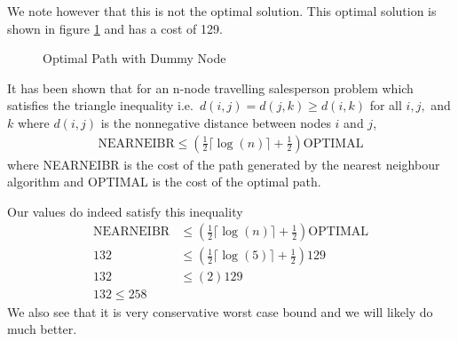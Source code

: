 We note however that this is not the optimal solution. This optimal solution is shown in 
figure \ref{fig:optDummy} and has a cost of 129.

\begin{figure}
\centering
{}
\caption{Optimal Path with Dummy Node}
\label{fig:optDummy}
\end{figure}



It has been shown \cite{rosenkrantz74} that for an n-node travelling salesperson problem which satisfies the triangle inequality i.e.\ $d(i,j) = d(j,k) \geq d(i,k)$ for all $i,j,$ and $k$ where $d(i,j)$ is the nonnegative distance between nodes $i$ and $j$, 
\begin{align*}
\text{NEARNEIBR} \leq (\frac{1}{2} \lceil \log(n) \rceil + \frac{1}{2})\text{OPTIMAL}
\end{align*}
where NEARNEIBR is the cost of the path generated by the nearest neighbour algorithm and OPTIMAL is the cost of the optimal path. 

Our values do indeed satisfy this inequality
\begin{align*}
\text{NEARNEIBR} &\leq (\frac{1}{2} \lceil \log(n) \rceil + \frac{1}{2})\text{OPTIMAL} \\
132 &\leq (\frac{1}{2} \lceil \log(5) \rceil + \frac{1}{2})129 \\
132 &\leq (2)129 \\
132 \leq 258 
\end{align*}
We also see that it is very conservative worst case bound and we will likely do much better.

